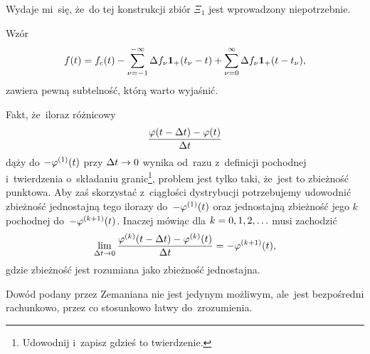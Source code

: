 \documentclass[a4paper,11pt]{article}
\begin{document}
Wydaje mi~się, że~do tej konstrukcji zbiór $\Xi_{ 1 }$ jest
wprowadzony niepotrzebnie.

\vspace{\spaceFour}


\start {}

\vspace{\spaceFour}


\start {}

\vspace{\spaceFour}


\start {} Wzór
\begin{equation}
  \label{eq:1}
  f( t ) = f_{ c }( t ) - \sum\limits_{ \nu = -1 }^{ -\infty } \Delta f_{ \nu }
  \mathbf{1}_{ + }( t_{ \nu } - t ) + \sum\limits_{ \nu = 0 }^{ \infty } \Delta f_{ \nu }
  \mathbf{1}_{ + }( t - t_{ \nu } ),
\end{equation}
zawiera pewną subtelność, którą warto wyjaśnić. \Dok

\vspace{\spaceFour}


\start {} Fakt, że~iloraz różnicowy
\begin{equation}
  \label{eq:Zem-s01-06}
  \frac{ \varphi( t - \Delta t ) - \varphi( t ) }{ \Delta t }
\end{equation}
dąży do $-\varphi^{ ( 1 ) }( t )$ przy $\Delta t \to 0$ wynika od~razu z~definicji
pochodnej i~twierdzenia o~składaniu granic\footnote{Udowodnij i~zapisz
  gdzieś to twierdzenie.}, problem jest tylko taki, że~jest to
zbieżność punktowa. Aby zaś skorzystać z~ciągłości dystrybucji
potrzebujemy udowodnić zbieżność jednostajną tego ilorazy do~$-\varphi^{ ( 1 ) }( t )$
oraz jednostajną zbieżność jego $k$\dywiz pochodnej
do~$-\varphi^{ ( k + 1 ) }( t )$. Inaczej mówiąc dla $k = 0, 1, 2, \ldots$
musi zachodzić
\begin{equation}
  \label{eq:Zem-s01-07}
  \lim\limits_{ \Delta t \to 0 } \frac{ \varphi^{ ( k ) }( t - \Delta t ) - \varphi^{ ( k ) }( t ) }
  { \Delta t } = -\varphi^{ ( k + 1 ) }( t ),
\end{equation}
gdzie zbieżność jest rozumiana jako zbieżność jednostajna.

Dowód podany przez Zemaniana nie jest jedynym możliwym, ale~jest
bezpośredni rachunkowo, przez co stosunkowo łatwy do~zrozumienia.
\end{document}
